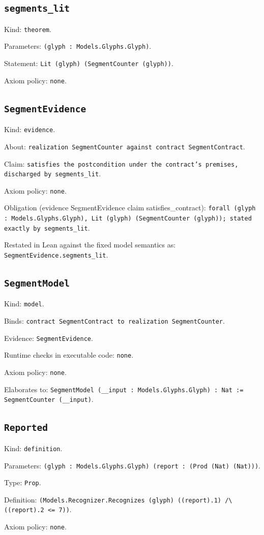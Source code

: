 \documentclass[11pt]{article}
\begin{document}
\subsection*{\texttt{segments\_lit}}
\noindent Kind: \texttt{theorem}.\par
\noindent Parameters: \texttt{(glyph : Models.Glyphs.Glyph)}.\par
\noindent Statement: \texttt{Lit (glyph) (SegmentCounter (glyph))}.\par
\noindent Axiom policy: \texttt{none}.\par
\subsection*{\texttt{SegmentEvidence}}
\noindent Kind: \texttt{evidence}.\par
\noindent About: \texttt{realization SegmentCounter against contract SegmentContract}.\par
\noindent Claim: \texttt{satisfies the postcondition under the contract's premises, discharged by segments\_lit}.\par
\noindent Axiom policy: \texttt{none}.\par
\noindent Obligation (evidence SegmentEvidence claim satisfies\_contract): \texttt{forall (glyph : Models.Glyphs.Glyph), Lit (glyph) (SegmentCounter (glyph)); stated exactly by segments\_lit}.\par
\noindent Restated in Lean against the fixed model semantics as: \texttt{SegmentEvidence.segments\_lit}.\par
\subsection*{\texttt{SegmentModel}}
\noindent Kind: \texttt{model}.\par
\noindent Binds: \texttt{contract SegmentContract to realization SegmentCounter}.\par
\noindent Evidence: \texttt{SegmentEvidence}.\par
\noindent Runtime checks in executable code: \texttt{none}.\par
\noindent Axiom policy: \texttt{none}.\par
\noindent Elaborates to: \texttt{SegmentModel (\_\_input : Models.Glyphs.Glyph) : Nat := SegmentCounter (\_\_input)}.\par
\subsection*{\texttt{Reported}}
\noindent Kind: \texttt{definition}.\par
\noindent Parameters: \texttt{(glyph : Models.Glyphs.Glyph) (report : (Prod (Nat) (Nat)))}.\par
\noindent Type: \texttt{Prop}.\par
\noindent Definition: \texttt{(Models.Recognizer.Recognizes (glyph) ((report).1) /\textbackslash{} ((report).2 <= 7))}.\par
\noindent Axiom policy: \texttt{none}.\par
\end{document}

